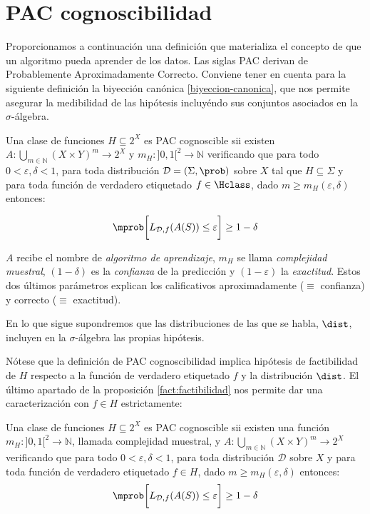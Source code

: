 \section{PAC cognoscibilidad}
Proporcionamos a continuación una definición que materializa el concepto de que un algoritmo pueda aprender de los datos. Las
siglas PAC derivan de Probablemente Aproximadamente Correcto. Conviene tener en cuenta para la siguiente definición la
biyección canónica \ref{biyeccion-canonica}, que nos permite asegurar la medibilidad de las hipótesis incluyéndo sus conjuntos
asociados en la $\sigma$-álgebra.

\begin{definition}
Una clase de funciones $H \subseteq 2^X$ es PAC cognoscible sii existen $A: \underset{m\in \mathbb{N}}{\bigcup} (X\times Y)^m \rightarrow 2^X$ 
y $m_{H} : ]0,1[^2\rightarrow \mathbb{N}$ verificando que para todo
$0 < \varepsilon, \delta < 1$, para toda distribución $\mathcal{D}=(\Sigma, \prob)$ sobre $X$ tal que $H\subseteq \Sigma$
y para toda función de verdadero etiquetado $f\in \Hclass$, dado $m \ge m_H(\varepsilon, \delta)$ entonces:

\[\mprob \bigg[L_{\mathcal{D},f}(A(S)) \le \varepsilon \bigg] \ge 1-\delta\]
\end{definition}

$A$ recibe el nombre de \textit{algoritmo de aprendizaje}, $m_H$ se llama \textit{complejidad muestral}, $(1-\delta)$ es la 
\textit{confianza} de la predicción y $(1-\varepsilon)$ la \textit{exactitud}. Estos dos últimos parámetros explican los 
calificativos aproximadamente ($\equiv$ confianza) y correcto ($\equiv$ exactitud).

En lo que sigue supondremos que las distribuciones de las que se habla, $\dist$, incluyen en la $\sigma$-álgebra las propias
hipótesis.

Nótese que la definición de PAC cognoscibilidad implica hipótesis de factibilidad de $H$ respecto a la función de verdadero
etiquetado $f$ y la distribución $\dist$. El último apartado de la proposición \ref{fact:factibilidad} 
nos permite dar una caracterización con $f\in H$ estrictamente:

\begin{charact}
Una clase de funciones $H \subseteq 2^X$ es PAC cognoscible sii existen una función 
$m_{H} : ]0,1[^2\rightarrow \mathbb{N}$, llamada complejidad muestral, y 
$A: \underset{m\in \mathbb{N}}{\bigcup} (X\times Y)^m \rightarrow 2^X$ verificando que para todo
$0 < \varepsilon, \delta < 1$, para toda distribución $\mathcal{D}$ sobre $X$ y para toda función de 
verdadero etiquetado $f\in H$, dado $m \ge m_H(\varepsilon, \delta)$ entonces:
\[\mprob \bigg[L_{\mathcal{D},f}(A(S)) \le \varepsilon \bigg] \ge 1-\delta\]

\label{def:pac}
\end{charact}

